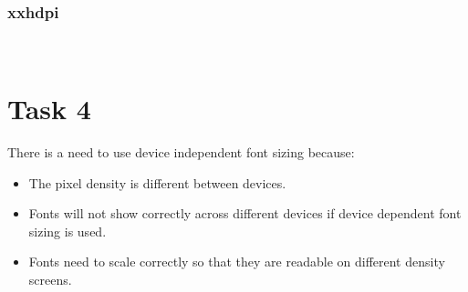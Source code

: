 \documentclass[11pt,english,numbers=endperiod]{scrartcl}
\begin{document}
\subsubsection{xxhdpi}
\\
\bigskip

\section{Task 4}
\raggedright{There is a need to use device independent font sizing because:}\\
\begin{itemize}
	\item The pixel density is different between devices.
	\item Fonts will not show correctly across different devices if device dependent font sizing is used.
	\item Fonts need to scale correctly so that they are readable on different density screens.

\end{itemize}
\end{document}
